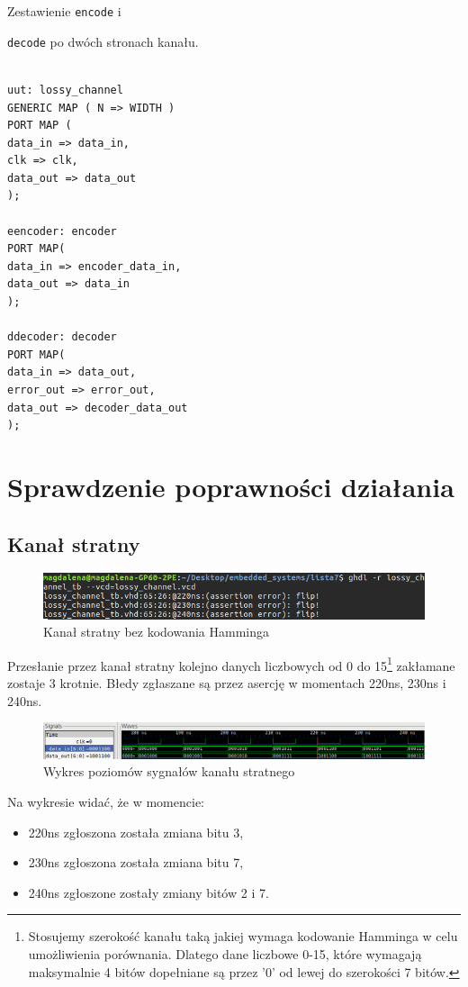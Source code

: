 \documentclass[a4paper,11pt]{article}
\begin{document}
				Zestawienie \texttt{encode} i {\texttt{decode} po dwóch stronach kanału.
				\begin{verbatim}

uut: lossy_channel 
GENERIC MAP ( N => WIDTH )
PORT MAP (
data_in => data_in,
clk => clk,
data_out => data_out
);

eencoder: encoder
PORT MAP(
data_in => encoder_data_in,
data_out => data_in
);

ddecoder: decoder
PORT MAP(
data_in => data_out,
error_out => error_out,
data_out => decoder_data_out
);	
				\end{verbatim}
				
			\section{Sprawdzenie poprawności działania}
			\subsection{Kanał stratny}
			\begin{figure}[H]
				\centering
				\includegraphics[width=16cm]{terminal}
				\caption{Kanał stratny bez kodowania Hamminga}
			\end{figure}
			
			Przesłanie przez kanał stratny kolejno danych liczbowych od 0 do 15\footnote{Stosujemy szerokość kanału taką jakiej wymaga kodowanie Hamminga w celu umożliwienia porównania. Dlatego dane liczbowe 0-15, które wymagają maksymalnie 4 bitów dopełniane są przez '0' od lewej do szerokości 7 bitów.} zakłamane zostaje 3 krotnie. Błedy zgłaszane są przez asercję w momentach 220ns, 230ns i 240ns.
			
			\begin{figure}[H]
				\centering
				\includegraphics[width=\textwidth]{gtk}
				\caption{Wykres poziomów sygnałów kanału stratnego}
			\end{figure}
			
			Na wykresie widać, że w momencie:
			\begin{itemize}
				\item 220ns zgłoszona została zmiana bitu 3,
				\item 230ns zgłoszona została zmiana bitu 7,
				\item 240ns zgłoszone zostały zmiany bitów 2 i 7.
			\end{itemize}
			
}
\end{document}

